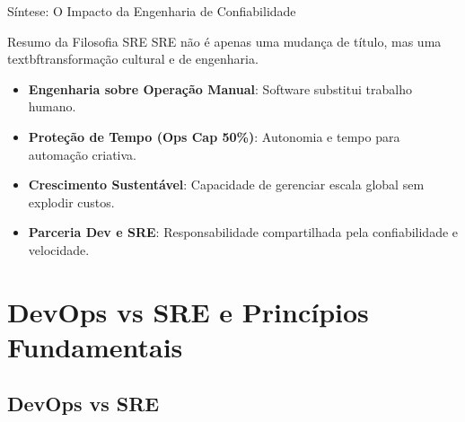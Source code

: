 \documentclass[9pt]{beamer}
\begin{document}
\begin{frame}{Síntese: O Impacto da Engenharia de Confiabilidade}
\begin{block}{Resumo da Filosofia SRE}
SRE não é apenas uma mudança de título, mas uma \\textbf{transformação cultural e de engenharia}.
\end{block}

\vspace{0.3cm}
\begin{itemize}
    \item \textbf{Engenharia sobre Operação Manual}: Software substitui trabalho humano.
    \item \textbf{Proteção de Tempo (Ops Cap 50\%)}: Autonomia e tempo para automação criativa.
    \item \textbf{Crescimento Sustentável}: Capacidade de gerenciar escala global sem explodir custos.
    \item \textbf{Parceria Dev e SRE}: Responsabilidade compartilhada pela confiabilidade e velocidade.
\end{itemize}
\end{frame}

\section{DevOps vs SRE e Princípios Fundamentais}

\subsection{DevOps vs SRE}
\end{document}
